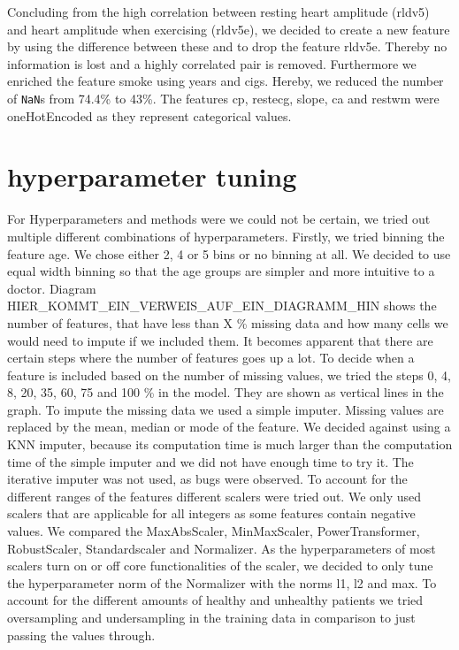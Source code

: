 Concluding from the high correlation between resting heart amplitude (rldv5) and heart amplitude when exercising (rldv5e), we decided to create a new feature by using the difference between these and to drop the feature rldv5e. Thereby no information is lost and a highly correlated pair is removed. Furthermore we enriched the feature smoke using years and cigs. Hereby, we reduced the number of \texttt{NaN}s from 74.4\% to 43\%. The features cp, restecg, slope, ca and restwm were oneHotEncoded as they represent categorical values. 

\section{hyperparameter tuning }
For Hyperparameters and methods were we could not be certain, we tried out multiple different combinations of hyperparameters.
Firstly, we tried binning the feature age. We chose either 2, 4 or 5 bins or no binning at all. We decided to use equal width binning so that the age groups are simpler and more intuitive to a doctor.
Diagram HIER_KOMMT_EIN_VERWEIS_AUF_EIN_DIAGRAMM_HIN shows the number of features, that have less than X \% missing data and how many cells we would need to impute if we included them. It becomes apparent that there are certain steps where the number of features goes up a lot. To decide when a feature is included based on the number of missing values, we tried the steps 0, 4, 8, 20, 35, 60, 75 and 100 \% in the model. They are shown as vertical lines in the graph.
To impute the missing data we used a simple imputer. Missing values are replaced by the mean, median or mode of the feature. We decided against using a KNN imputer, because its computation time is much larger than the computation time of the simple imputer and we did not have enough time to try it. The iterative imputer was not used, as bugs were observed.
To account for the different ranges of the features different scalers were tried out. We only used scalers that are applicable for all integers as some features contain negative values. 
We compared the MaxAbsScaler, MinMaxScaler, PowerTransformer, RobustScaler, Standardscaler and Normalizer. As the hyperparameters of most scalers turn on or off core functionalities of the scaler, we decided to only tune the hyperparameter norm of the Normalizer with the norms l1, l2 and max.
To account for the different amounts of healthy and unhealthy patients we tried oversampling and undersampling in the training data in comparison to just passing the values through.




